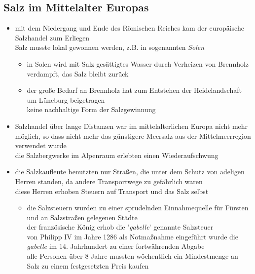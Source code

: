 \documentclass[11pt,a4paper]{article}
\begin{document}
\subsection*{\textsf{Salz im Mittelalter Europas}}

\begin{itemize}

\item mit dem Niedergang und Ende des Römischen Reiches kam der europäische Salzhandel zum Erliegen\\
 Salz musste lokal gewonnen werden, z.B. in sogenannten \textsl{Solen}

	\begin{itemize}
	\item in Solen wird mit Salz gesättigtes Wasser durch Verheizen von Brennholz verdampft, das Salz bleibt zurück
	\item der große Bedarf an Brennholz hat zum Entstehen der Heidelandschaft um Lüneburg beigetragen\\
	 keine nachhaltige Form der Salzgewinnung
	\end{itemize}

\item Salzhandel über lange Distanzen war im mittelalterlichen Europa nicht mehr möglich, so dass nicht mehr das günstigere Meersalz aus der Mittelmeerregion verwendet wurde\\
 die Salzbergwerke im Alpenraum erlebten einen Wiederaufschwung

\item die Salzkaufleute benutzten nur Straßen, die unter dem Schutz von adeligen Herren standen, da andere Transportwege zu gefährlich waren\\
 diese Herren erhoben Steuern auf Transport und das Salz selbst

	\begin{itemize}
	\item die Salzsteuern wurden zu einer sprudelnden Einnahmequelle für Fürsten und an Salzstraßen gelegenen Städte\\
	 der französische König erhob die '\textsl{gabelle}' genannte Salzsteuer\\
	 von Philipp IV im Jahre 1286 als Notmaßnahme eingeführt wurde die \textsl{gabelle} im 14. Jahrhundert zu einer fortwährenden Abgabe\\
	 alle Personen über 8 Jahre mussten wöchentlich ein Mindestmenge an Salz zu einem festgesetzten Preis kaufen
	

\end{itemize}
\end{itemize}
\end{document}
